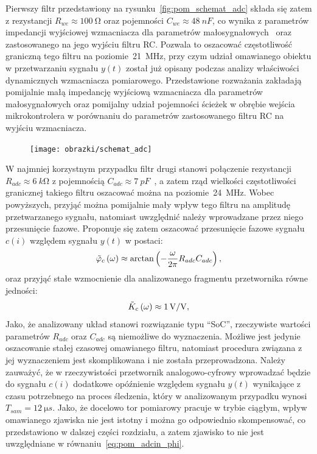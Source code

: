 Pierwszy filtr przedstawiony na rysunku~\ref{fig:pom_schemat_adc} składa się zatem z rezystancji $R_{we} \approx \qty{100}{\ohm}$ oraz pojemności $C_{we} \approx \qty{48}{nF}$, co wynika z parametrów impedancji wyjściowej wzmacniacza dla parametrów małosygnałowych~\cite{microchip_application} oraz zastosowanego na jego wyjściu filtru RC. Pozwala to oszacować częstotliwość graniczną tego filtru na poziomie~\qty{21}{MHz}, przy czym udział omawianego obiektu w przetwarzaniu sygnału $y(t)$ został już opisany podczas analizy właściwości dynamicznych wzmacniacza pomiarowego. Przedstawione rozważania zakładają pomijalnie małą impedancję wyjściową wzmacniacza dla parametrów małosygnałowych oraz pomijalny udział pojemności ścieżek w obrębie wejścia mikrokontrolera w porównaniu do parametrów zastosowanego filtru RC na wyjściu wzmacniacza.

\begin{figure}[htb!]
\begin{center}
\texttt{[image: obrazki/schemat\_adc]}
\end{center}
\end{figure}

W najmniej korzystnym przypadku filtr drugi stanowi połączenie rezystancji $R_{adc} \approx \qty{6}{k \ohm}$ z pojemnością $C_{adc} \approx \qty{7}{pF}$~\cite{stm_f411}, a zatem rząd wielkości częstotliwości granicznej takiego filtru oszacować można na poziomie~\qty{24}{MHz}. Wobec powyższych, przyjąć można pomijalnie mały wpływ tego filtru na amplitudę przetwarzanego sygnału, natomiast uwzględnić należy wprowadzane przez niego przesunięcie fazowe. Proponuje się zatem oszacować przesunięcie fazowe sygnału $c(i)$ względem sygnału $y(t)$ w postaci:
\begin{equation}
\tilde{\varphi}_{c} \left(\omega\right) \approx \arctan \left(-\frac{\omega}{2\pi} R_{adc} C_{adc}\right) \label{eq:pom_adcin_phi},
\end{equation}
oraz przyjąć stałe wzmocnienie dla analizowanego fragmentu przetwornika równe jedności:
\begin{equation}
\tilde{K}_{c} \left(\omega\right) \approx \qty{1}{V \per V} \label{eq:pom_adcin_amp},
\end{equation}
Jako, że analizowany układ stanowi rozwiązanie typu \enquote{SoC}, rzeczywiste wartości parametrów $R_{adc}$ oraz $C_{adc}$ są niemożliwe do wyznaczenia. Możliwe jest jedynie oszacowanie stałej czasowej omawianego filtru, natomiast procedura związana z jej wyznaczeniem jest skomplikowana i nie została przeprowadzona. Należy zauważyć, że w rzeczywistości przetwornik analogowo-cyfrowy wprowadzać będzie do sygnału $c(i)$ dodatkowe opóźnienie względem sygnału $y(t)$ wynikające z czasu potrzebnego na proces śledzenia, który w analizowanym przypadku wynosi $T_{sam} = \qty{12}{\micro s}$. Jako, że docelowo tor pomiarowy pracuje w trybie ciągłym, wpływ omawianego zjawiska nie jest istotny i można go odpowiednio skompensować, co przedstawiono w dalszej części rozdziału, a zatem zjawisko to nie jest uwzględniane w równaniu~\eqref{eq:pom_adcin_phi}.

